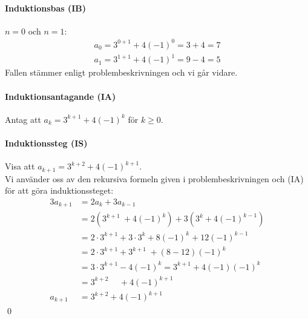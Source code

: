 \paragraph{Induktionsbas (IB)} $n=0$ och $n=1$:
\begin{align*}
a_0=3^{0+1}+4(-1)^0 = 3+4 = 7 \\[5pt]
a_1=3^{1+1}+4(-1)^1 = 9-4 = 5
\end{align*}
Fallen stämmer enligt problembeskrivningen och vi går vidare.

\paragraph{Induktionsantagande (IA)} Antag att $a_k=3^{k+1}+4(-1)^k$ för $k\ge 0$.

\paragraph{Induktionssteg (IS)} Visa att $a_{k+1}=3^{k+2}+4(-1)^{k+1}$.\\
Vi använder oss av den rekursiva formeln given i problembeskrivningen och (IA) för att göra induktionssteget:
\begin{alignat*}{3}
a_{k+1} &= 2a_k+3a_{k-1} \\[5pt]
&= 2(3^{k+1\hspace{4pt}}+4(-1)^k) + 3(3^{k}+4(-1)^{k-1})\\[5pt]
&= 2\cdot3^{k+1}+3\cdot 3^k+8(-1)^k\hspace{1pt}+12(-1)^{k-1} \\[5pt]
&= 2\cdot 3^{k+1}+3^{k+1}\hspace{3pt}+ (8-12)(-1)^{k} \\[5pt]
&= 3\cdot 3^{k+1}-4(-1)^{k} = 3^{k+1} + 4(-1)(-1)^k \\[5pt]
&= 3^{k+2}\hspace{15pt}+4(-1)^{k+1} \\[35pt]
a_{k+1} &= 3^{k+2}+4(-1)^{k+1}
\end{alignat*}
\hfill\qed


